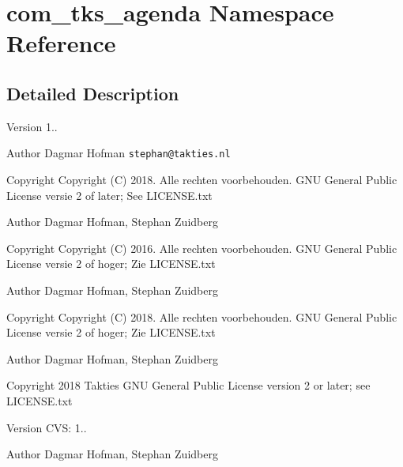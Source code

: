 \section{com\+\_\+tks\+\_\+agenda Namespace Reference}
\label{namespacecom__tks__agenda}


\subsection{Detailed Description}
\begin{DoxyVersion}{Version}
1..
\end{DoxyVersion}
\begin{DoxyAuthor}{Author}
Dagmar Hofman {\tt stephan@takties.\+nl} 
\end{DoxyAuthor}
\begin{DoxyCopyright}{Copyright}
Copyright (C) 2018. Alle rechten voorbehouden.  G\+NU General Public License versie 2 of later; See L\+I\+C\+E\+N\+S\+E.\+txt
\end{DoxyCopyright}
\begin{DoxyAuthor}{Author}
Dagmar Hofman, Stephan Zuidberg 
\end{DoxyAuthor}
\begin{DoxyCopyright}{Copyright}
Copyright (C) 2016. Alle rechten voorbehouden.  G\+NU General Public License versie 2 of hoger; Zie L\+I\+C\+E\+N\+S\+E.\+txt
\end{DoxyCopyright}
\begin{DoxyAuthor}{Author}
Dagmar Hofman, Stephan Zuidberg 
\end{DoxyAuthor}
\begin{DoxyCopyright}{Copyright}
Copyright (C) 2018. Alle rechten voorbehouden.  G\+NU General Public License versie 2 of hoger; Zie L\+I\+C\+E\+N\+S\+E.\+txt
\end{DoxyCopyright}
\begin{DoxyAuthor}{Author}
Dagmar Hofman, Stephan Zuidberg 
\end{DoxyAuthor}
\begin{DoxyCopyright}{Copyright}
2018 Takties  G\+NU General Public License version 2 or later; see L\+I\+C\+E\+N\+S\+E.\+txt
\end{DoxyCopyright}
\begin{DoxyVersion}{Version}
C\+VS\+: 1..
\end{DoxyVersion}
\begin{DoxyAuthor}{Author}
Dagmar Hofman, Stephan Zuidberg 
\end{DoxyAuthor}
